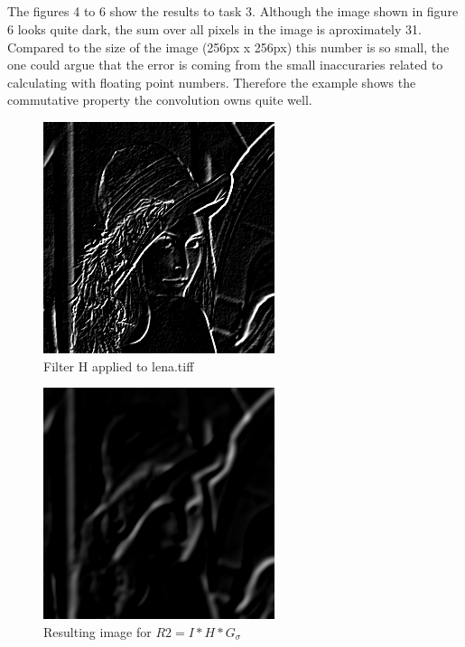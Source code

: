 \documentclass[12pt,a4paper]{article}
\begin{document}
\subsection{}
The figures 4 to 6 show the results to task 3. Although the image shown in figure 6 looks quite dark, the sum over all pixels in the image is aproximately 31. Compared to the size of the image (256px x 256px) this number is so small, the one could argue that the error is coming from the small inaccuraries related to calculating with floating point numbers. 
Therefore the example shows the commutative property the convolution owns quite well. 

\begin{figure}[h]
	\begin{center}
		\includegraphics[scale=1]{./images/imH.png}
		\caption{Filter H applied to lena.tiff} 
	\end{center}
\end{figure}

\begin{figure}[h]
	\begin{center}
		\includegraphics[scale=1]{./images/imR2.png}
		\caption{Resulting image for $R2 = I * H * G_{\sigma}$} 
	\end{center}
\end{figure}
\end{document}
